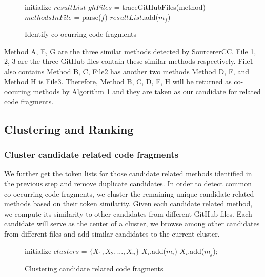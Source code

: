 \begin{figure}[h]
		\label{alg: co-occur}
 \removelatexerror
\begin{algorithm}[H]
	\caption{Identify co-ocurring code fragments}
	initialize $resultList$\;
	{
		$ghFiles$ = traceGitHubFiles(method) \;
		{
			$methodsInFile$ = parse($f$)\;
			{
				{
					$resultList$.add($m_f$) \;
				}
			}
		} 
	}
\end{algorithm}
\end{figure}

{\ttt Method A, E, G} are the three similar methods detected by SourcererCC. {\ttt File 1, 2, 3} are the three GitHub files contain these similar methods respectively. 
{\ttt File1} also contains {\ttt Method B, C}, {\ttt File2} has another two methods {\ttt Method D, F}, and {\ttt Method H} is {\ttt File3}. Therefore, {\ttt Method B, C, D, F, H} will be returned as co-occuring methods by Algorithm 1 and they are taken as our candidate for related code fragments.

\subsection{Clustering and Ranking}
\subsubsection{Cluster candidate related code fragments}
We further get the token lists for those candidate related methods identified in the previous step and remove duplicate candidates. In order to detect common co-occurring code fragments, we cluster the remaining unique candidate related methods
based on their token similarity.  Given each candidate related method, we compute its similarity to other candidates from different GitHub files. Each candidate will serve as the center of a cluster, we browse among other candidates from different files and add similar candidates to the current cluster.

\begin{figure}[h]
	\label{alg: Clustering candidate related methods}
	\removelatexerror
	\begin{algorithm}[H]
		\caption{Clustering candidate related code fragments}
		initialize $clusters$ = $\{X_1, X_2,..., X_n\}$\;
		{
			$X_i$.add($m_i$) \;
			{
				{
					{
						$X_i$.add($m_j$);
					}
				}
			} 
		}
	\end{algorithm}
\end{figure}

